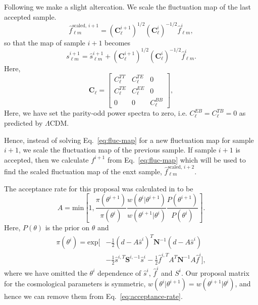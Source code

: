 \documentclass[twocolumn]{../common/aa}
\def\LCDM{$\Lambda$CDM}
\begin{document}
Following \cite{racine:2016} we make a slight altercation. We scale the fluctuation map of the last accepted sample.
\begin{equation}
    \hat{f}_{\ell m}^{\textrm{scaled},\, i+1} = \left(\textbf{C}^{i+1}_{\ell}\right)^{1/2}\left(\textbf{C}^{i}_{\ell}\right)^{-1/2} \hat{f}_{\ell m}^{i},
\end{equation}
so that the map of sample $i+1$ becomes
\begin{equation}
    s^{i+1}_{\ell m} = \hat{s}_{\ell m}^{i+1} + \left(\textbf{C}^{i+1}_{\ell}\right)^{1/2}\left(\textbf{C}^{i}_{\ell}\right)^{-1/2} \hat{f}_{\ell m}^{i}.
\end{equation}
Here,
\begin{equation}
\textbf{C}_{\ell} = \begin{bmatrix}
C^{TT}_\ell & C^{TE}_\ell & 0\\
C^{TE}_\ell & C^{EE}_\ell & 0\\
0 & 0 & C^{BB}_\ell
\end{bmatrix},
\end{equation}
Here, we have set the parity-odd power spectra to zero, i.e. $C^{EB}_\ell =C^{TB}_\ell = 0$ as predicted by \LCDM.

Hence, instead of solving Eq.~\eqref{eq:fluc-map} for a new fluctuation map for sample $i+1$, we scale the fluctuation map of the previous sample. If sample $i+1$ is accepted, then we calculate $f^{i+1}$ from Eq.~\eqref{eq:fluc-map} which will be used to find the scaled fluctuation map of the enxt sample, $\hat{f}_{\ell m}^{\textrm{scaled},\, i+2}$.

The acceptance rate for this proposal was calculated in \cite{racine:2016} to be
\begin{equation}
    \label{eq:acceptance-rate}
    A = \mathrm{min}\left[1, \frac{\pi(\theta^{i+1})}{\pi(\theta^i)} \frac{w(\theta^{i} |\theta^{i+1})}{w(\theta^{i+1} |\theta^i) }\frac{P(\theta^{i+1})}{P(\theta^i)} \right].
\end{equation}
Here, $P(\theta)$ is the prior on $\theta$ and
\begin{align}
    \nonumber
    \pi(\theta^{i}) = \mathrm{exp}\bigg[&-\frac12 \left(d-A\hat{s}^i\right)^T \textbf{N}^{-1}\left(d-A\hat{s}^i\right)\\
    &-\frac12 \hat{s}^{i,T} \textbf{S}^{i, -1}\hat{s}^i -\frac12 \hat{f}^{i, T}A^T\textbf{N}^{-1} A\hat{f}^i\bigg],
\end{align}
where we have omitted the $\theta^i$ dependence of $\hat{s}^i$, $\hat{f}^i$ and $S^i$. Our proposal matrix for the cosmological parameters is symmetric, $w(\theta^{i} |\theta^{i+1}) = w(\theta^{i+1} |\theta^{i})$, and hence we can remove them from Eq.~\eqref{eq:acceptance-rate}.
\end{document}
